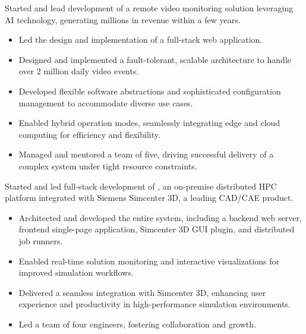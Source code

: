 \documentclass{mycv}
\begin{document}
\begin{sectionindent}

    Started and lead development of a remote video monitoring solution leveraging AI technology, generating millions in revenue within a few years.

    \begin{itemize}
        \item Led the design and implementation of a full-stack web application.
        \item Designed and implemented a fault-tolerant, scalable architecture to handle over 2 million daily video events.
        \item Developed flexible software abstractions and sophisticated configuration management to accommodate diverse use cases.
        \item Enabled hybrid operation modes, seamlessly integrating edge and cloud computing for efficiency and flexibility.
        \item Managed and mentored a team of five, driving successful delivery of a complex system under tight resource constraints.
    \end{itemize}


    Started and led full-stack development of \href{https://blogs.sw.siemens.com/simcenter/simcenter-3d-2022-1-remote-solve/}{}, an on-premise distributed HPC platform integrated with Siemens Simcenter 3D, a leading CAD/CAE product.

    \begin{itemize}
        \item Architected and developed the entire system, including a backend web server, frontend single-page application, Simcenter 3D GUI plugin, and distributed job runners.
        \item Enabled real-time solution monitoring and interactive visualizations for improved simulation workflows.
        \item Delivered a seamless integration with Simcenter 3D, enhancing user experience and productivity in high-performance simulation environments.
        \item Led a team of four engineers, fostering collaboration and growth.
    \end{itemize}


\end{sectionindent}
\end{document}
